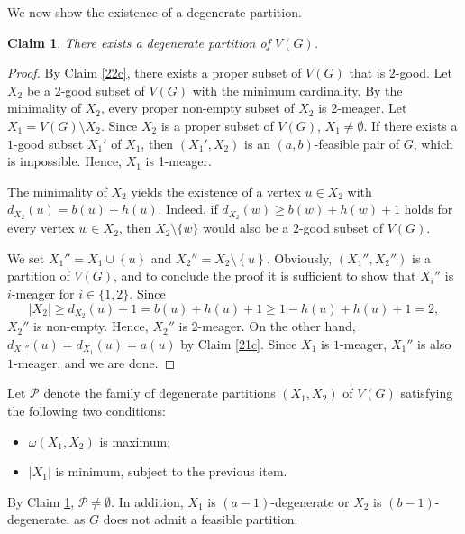 \documentclass[11p]{elsarticle}
\newtheorem{claim}[theorem]{Claim}
\theoremstyle{definition}
\begin{document}
We now show the existence of a degenerate partition.
	
	
\begin{claim}\label{23c}
		There exists a degenerate partition of $ V(G) $.
	\end{claim} \begin{proof}
	By Claim \ref{22c}, there exists a proper subset of $ V(G) $ that is $ 2 $-good. Let $ X_2 $ be a 2-good subset of $V(G)$ with the minimum cardinality. By the minimality of $ X_2 $, every proper non-empty subset of $ X_2 $ is 2-meager. Let $ X_1=V(G)\setminus X_2 $. Since $ X_2 $ is a proper subset of $ V(G) $, $ X_1\neq\emptyset $. If there exists a $ 1 $-good subset $ X_1' $ of $ X_1 $, then $ (X_1',X_2) $ is an $ (a,b) $-feasible pair of $ G $, which is impossible. Hence, $ X_1 $ is 1-meager.
	
	The minimality of $ X_2 $ yields the existence of a vertex $ u\in X_2 $ with $ d_{X_2}(u)=b(u)+h(u) $. Indeed, if $ d_{X_2}(w)\ge b(w)+h(w)+1 $ holds for every vertex $ w\in X_2 $, then   $ X_2\setminus\{w\} $ would also be a  $ 2 $-good subset of $ V(G) $. 
	
	We set $ X_1''=X_1\cup\left\lbrace u \right\rbrace$ and $ X_2''=X_2\setminus \left\lbrace u \right\rbrace  $. Obviously, $(X_1'', X_2'')$ is a partition of $V(G)$, and to conclude the proof it is sufficient to show that $X_i''$ is $i$-meager for $i\in\{1,2\}$. Since $$ \left| X_2\right|\ge d_{X_2}(u)+1= b(u)+h(u)+1\ge 1-h(u)+h(u)+1=2,$$ $ X_2'' $ is non-empty. Hence, $ X_2'' $ is $ 2 $-meager. On the other hand, $d_{X_1''}(u)=d_{X_1}(u)=a(u)$ by Claim \ref{21c}. Since $ X_1 $ is $ 1 $-meager,  $ X_1'' $ is also $ 1 $-meager, and we are done.
\end{proof}

Let  $ \mathcal{P} $ denote the family of degenerate partitions $ (X_1,X_2) $ of $ V(G) $ satisfying the following two conditions:
\begin{itemize}
	\item $ \omega(X_1,X_2) $ is maximum;
	\item  $ \left| X_1\right|  $ is  minimum,  subject to the previous item.
\end{itemize}
By Claim \ref{23c}, $ \mathcal{P}\neq\emptyset $. In addition,  $ X_1 $  is  $ (a-1) $-degenerate  or  $ X_2 $  is  $ (b-1) $-degenerate, as  $ G $  does not admit a feasible partition.
\end{document}
